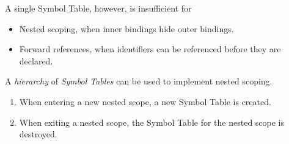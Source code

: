 \begin{remark}
    A single Symbol Table, however, is insufficient for
    \begin{itemize}
        \item Nested scoping, when inner bindings hide outer bindings.
        \item Forward references, when identifiers can be referenced before they are declared.
    \end{itemize}
\end{remark}

\begin{definition}
    A \textit{hierarchy} of \textit{Symbol Tables} can be used to implement nested scoping.
    
    \begin{enumerate}
        \item When entering a new nested scope, a new Symbol Table is created.
        \item When exiting a nested scope, the Symbol Table for the nested scope is destroyed.
    \end{enumerate}
\end{definition}

